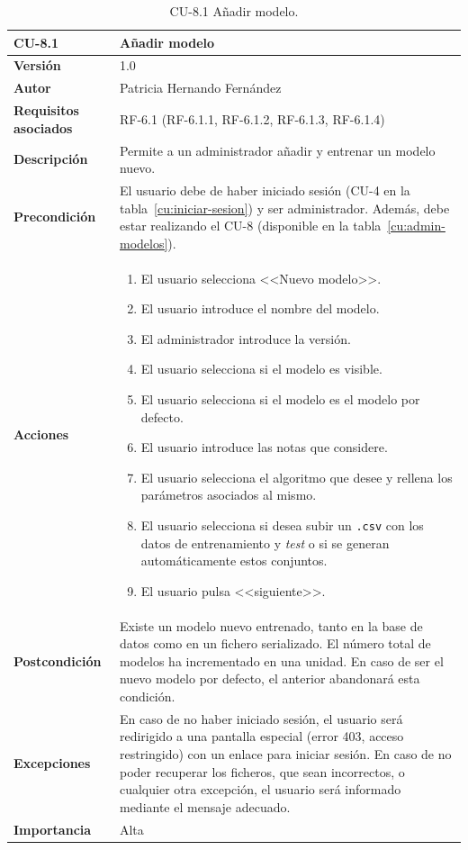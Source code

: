 \begin{table}[p]
	\centering
	\begin{tabularx}{\linewidth}{ p{} p{} }
		\toprule
		\textbf{CU-8.1}    & \textbf{Añadir modelo}\\
		\toprule
		\textbf{Versión}              & 1.0    \\
		\textbf{Autor}                & Patricia Hernando Fernández \\
		\textbf{Requisitos asociados} & RF-6.1 (RF-6.1.1, RF-6.1.2, RF-6.1.3, RF-6.1.4) \\
		\textbf{Descripción}          & Permite a un administrador añadir y entrenar un modelo nuevo.\\
		\textbf{Precondición}         & El usuario debe de haber iniciado sesión (CU-4 en la tabla~\ref{cu:iniciar-sesion}) y ser administrador. Además, debe estar realizando el CU-8 (disponible en la tabla~\ref{cu:admin-modelos}). \\
		\textbf{Acciones}             &
		\begin{enumerate}
			\def\labelenumi{\arabic{enumi}.}
			\tightlist
			\item El usuario selecciona <<Nuevo modelo>>.
			\item El usuario introduce el nombre del modelo.
			\item El administrador introduce la versión.
			\item El usuario selecciona si el modelo es visible.
			\item El usuario selecciona si el modelo es el modelo por defecto.
			\item El usuario introduce las notas que considere.
			\item El usuario selecciona el algoritmo que desee y rellena los parámetros asociados al mismo.
			\item El usuario selecciona si desea subir un \texttt{.csv} con los datos de entrenamiento y \textit{test} o si se generan automáticamente estos conjuntos.
			\item El usuario pulsa <<siguiente>>.
		\end{enumerate}\\
		\textbf{Postcondición}        & Existe un modelo nuevo entrenado, tanto en la base de datos como en un fichero serializado. El número total de modelos ha incrementado en una unidad. En caso de ser el nuevo modelo por defecto, el anterior abandonará esta condición. \\
		\textbf{Excepciones}          & En caso de no haber iniciado sesión, el usuario será redirigido a una pantalla especial (error 403, acceso restringido) con un enlace para iniciar sesión. En caso de no poder recuperar los ficheros, que sean incorrectos, o cualquier otra excepción, el usuario será informado mediante el mensaje adecuado.\\
		\textbf{Importancia}          & Alta \\
		\bottomrule
	\end{tabularx}
	\caption{CU-8.1 Añadir modelo.}
	\label{cu:anadir-modelo}
\end{table}


